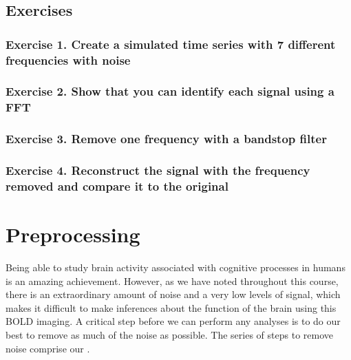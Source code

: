 \documentclass[letterpaper,10pt,english]{sphinxmanual}
\begin{document}
\noindent{}

\noindent{}


\subsection{Exercises}
\label{\detokenize{content/Signal_Processing:exercises}}

\subsubsection{Exercise 1. Create a simulated time series with 7 different frequencies with noise}
\label{\detokenize{content/Signal_Processing:exercise-1-create-a-simulated-time-series-with-7-different-frequencies-with-noise}}

\subsubsection{Exercise 2. Show that you can identify each signal using a FFT}
\label{\detokenize{content/Signal_Processing:exercise-2-show-that-you-can-identify-each-signal-using-a-fft}}

\subsubsection{Exercise 3. Remove one frequency with a bandstop filter}
\label{\detokenize{content/Signal_Processing:exercise-3-remove-one-frequency-with-a-bandstop-filter}}

\subsubsection{Exercise 4. Reconstruct the signal with the frequency removed and compare it to the original}
\label{\detokenize{content/Signal_Processing:exercise-4-reconstruct-the-signal-with-the-frequency-removed-and-compare-it-to-the-original}}

\section{Preprocessing}
\label{\detokenize{content/Preprocessing:preprocessing}}\label{\detokenize{content/Preprocessing::doc}}

Being able to study brain activity associated with cognitive processes in humans is an amazing achievement. However, as we have noted throughout this course, there is an extraordinary amount of noise and a very low levels of signal, which makes it difficult to make inferences about the function of the brain using this BOLD imaging. A critical step before we can perform any analyses is to do our best to remove as much of the noise as possible. The series of steps to remove noise comprise our .
\end{document}

